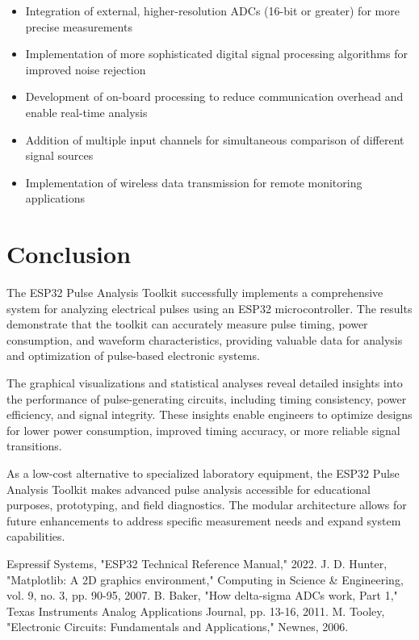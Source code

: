 \documentclass[conference]{IEEEtran}
\begin{document}
\begin{itemize}
    \item Integration of external, higher-resolution ADCs (16-bit or greater) for more precise measurements
    
    \item Implementation of more sophisticated digital signal processing algorithms for improved noise rejection
    
    \item Development of on-board processing to reduce communication overhead and enable real-time analysis
    
    \item Addition of multiple input channels for simultaneous comparison of different signal sources
    
    \item Implementation of wireless data transmission for remote monitoring applications
\end{itemize}

\section{Conclusion}
The ESP32 Pulse Analysis Toolkit successfully implements a comprehensive system for analyzing electrical pulses using an ESP32 microcontroller. The results demonstrate that the toolkit can accurately measure pulse timing, power consumption, and waveform characteristics, providing valuable data for analysis and optimization of pulse-based electronic systems.

The graphical visualizations and statistical analyses reveal detailed insights into the performance of pulse-generating circuits, including timing consistency, power efficiency, and signal integrity. These insights enable engineers to optimize designs for lower power consumption, improved timing accuracy, or more reliable signal transitions.

As a low-cost alternative to specialized laboratory equipment, the ESP32 Pulse Analysis Toolkit makes advanced pulse analysis accessible for educational purposes, prototyping, and field diagnostics. The modular architecture allows for future enhancements to address specific measurement needs and expand system capabilities.

\begin{thebibliography}{9}
 Espressif Systems, "ESP32 Technical Reference Manual," 2022.
 J. D. Hunter, "Matplotlib: A 2D graphics environment," Computing in Science \& Engineering, vol. 9, no. 3, pp. 90-95, 2007.
 B. Baker, "How delta-sigma ADCs work, Part 1," Texas Instruments Analog Applications Journal, pp. 13-16, 2011.
 M. Tooley, "Electronic Circuits: Fundamentals and Applications," Newnes, 2006.
\end{thebibliography}
\end{document}
